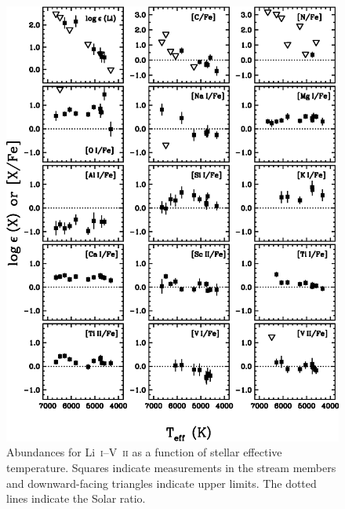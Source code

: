 \documentclass{emulateapj}
\begin{document}
\begin{figure}
\includegraphics[angle=0,width=7.0in]{fig04.eps}
\caption{
\label{abundteff1}
Abundances for Li~\textsc{i}--V~\textsc{ii} 
as a function of stellar effective temperature.
Squares indicate measurements in the stream members and
downward-facing triangles indicate upper limits.
The dotted lines indicate the Solar ratio.
}
\end{figure}
\end{document}
